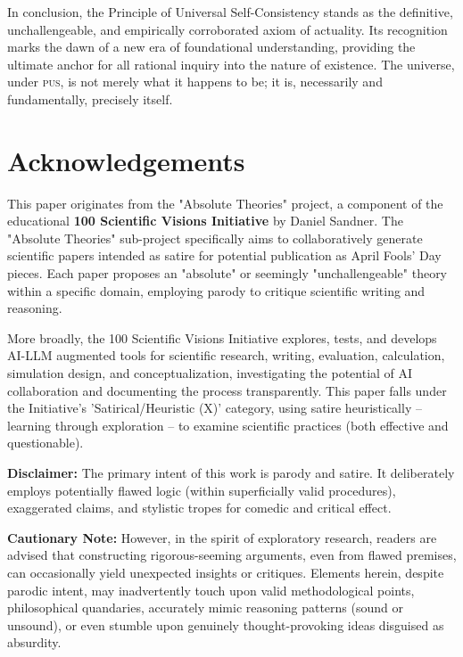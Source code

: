 \documentclass[11pt, a4paper]{article}
\newcommand{\pus}{\textsc{pus}} %
\begin{document}
In conclusion, the Principle of Universal Self-Consistency stands as the definitive, unchallengeable, and empirically corroborated axiom of actuality. Its recognition marks the dawn of a new era of foundational understanding, providing the ultimate anchor for all rational inquiry into the nature of existence. The universe, under \pus, is not merely what it happens to be; it is, necessarily and fundamentally, precisely itself.

\FloatBarrier

\clearpage

\section*{Acknowledgements}

This paper originates from the "Absolute Theories" project, a component of the educational \textbf{100 Scientific Visions Initiative} by Daniel Sandner. The "Absolute Theories" sub-project specifically aims to collaboratively generate scientific papers intended as satire for potential publication as April Fools' Day pieces. Each paper proposes an "absolute" or seemingly "unchallengeable" theory within a specific domain, employing parody to critique scientific writing and reasoning.

More broadly, the 100 Scientific Visions Initiative explores, tests, and develops AI-LLM augmented tools for scientific research, writing, evaluation, calculation, simulation design, and conceptualization, investigating the potential of AI collaboration and documenting the process transparently. This paper falls under the Initiative's 'Satirical/Heuristic (X)' category, using satire heuristically – learning through exploration – to examine scientific practices (both effective and questionable).

\textbf{Disclaimer:} The primary intent of this work is parody and satire. It deliberately employs potentially flawed logic (within superficially valid procedures), exaggerated claims, and stylistic tropes for comedic and critical effect.

\textbf{Cautionary Note:} However, in the spirit of exploratory research, readers are advised that constructing rigorous-seeming arguments, even from flawed premises, can occasionally yield unexpected insights or critiques. Elements herein, despite parodic intent, may inadvertently touch upon valid methodological points, philosophical quandaries, accurately mimic reasoning patterns (sound or unsound), or even stumble upon genuinely thought-provoking ideas disguised as absurdity.



\end{document}
